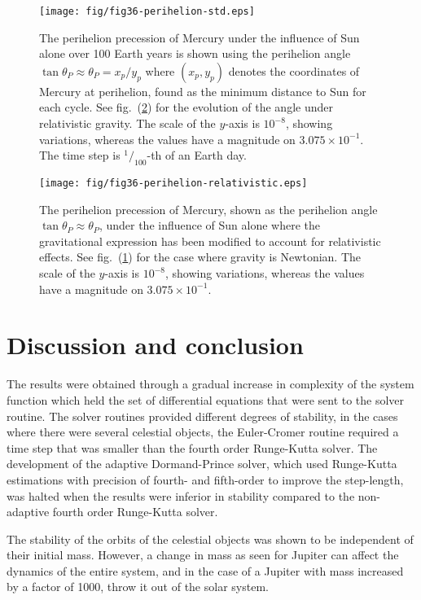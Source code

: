 \documentclass[a4paper,11pt]{article}
\begin{document}
\begin{figure}[htb]
    \centering
    \texttt{[image: fig/fig36-perihelion-std.eps]}
    \caption{The perihelion precession of Mercury under the influence of Sun alone over 100 Earth years is shown using the perihelion angle $\tan \theta_P \approx \theta_P = x_p/y_p$ where $(x_p, y_p)$ denotes the coordinates of Mercury at perihelion, found as the minimum distance to Sun for each cycle. See fig.~(\ref{fig:36b}) for the evolution of the angle under relativistic gravity. The scale of the $y$-axis is $10^{-8}$, showing variations, whereas the values have a magnitude on $3.075\times10^{-1}$. The time step is $^1\!/_{100}$-th of an Earth day. }
    \label{fig:36a}
\end{figure}

\begin{figure}[htb]
    \centering
    \texttt{[image: fig/fig36-perihelion-relativistic.eps]}
    \caption{The perihelion precession of Mercury, shown as the perihelion angle $\tan \theta_P \approx \theta_P$, under the influence of Sun alone where the gravitational expression has been modified to account for relativistic effects. See fig.~(\ref{fig:36a}) for the case where gravity is Newtonian. The scale of the $y$-axis is $10^{-8}$, showing variations, whereas the values have a magnitude on $3.075\times10^{-1}$. }
    \label{fig:36b}
\end{figure}

\section{Discussion and conclusion}
The results were obtained through a gradual increase in complexity of the system function which held the set of differential equations that were sent to the solver routine. The solver routines provided different degrees of stability, in the cases where there were several celestial objects, the Euler-Cromer routine required a time step that was smaller than the fourth order Runge-Kutta solver. The development of the adaptive Dormand-Prince solver, which used Runge-Kutta estimations with precision of fourth- and fifth-order to improve the step-length, was halted when the results were inferior in stability compared to the non-adaptive fourth order Runge-Kutta solver.

The stability of the orbits of the celestial objects was shown to be independent of their initial mass. However, a change in mass as seen for Jupiter can affect the dynamics of the entire system, and in the case of a Jupiter with mass increased by a factor of 1000, throw it out of the solar system.
\end{document}
